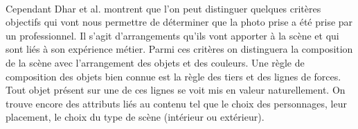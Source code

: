\documentclass[11pt, french]{report-rd-info}
\begin{document}
\paragraph*{}
Cependant Dhar et al. \cite{Dhar} montrent que l’on peut distinguer quelques critères objectifs qui vont nous permettre de déterminer que la photo prise a été prise par un professionnel. Il s’agit  d’arrangements qu’ils vont apporter à la scène et qui sont liés à son expérience métier. Parmi ces critères on distinguera la composition de la scène avec l'arrangement des objets et des couleurs. Une règle de composition des objets bien connue est la règle des tiers et des lignes de forces. Tout objet présent sur une de ces lignes se voit mis en valeur naturellement. On trouve encore des attributs liés au contenu tel que le choix des personnages, leur placement, le choix du type de scène (intérieur ou extérieur). 
\end{document}
